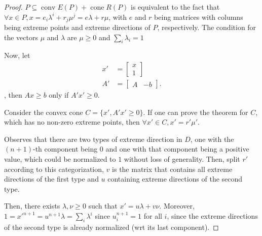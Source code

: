 \begin{proof}

\( P \subseteq \operatorname{conv} E(P) + \operatorname{cone} R(P) \) is equivalent to
the fact that \( \forall x\in P, x = e_{i}\lambda^{i} + r _{j}\mu ^{j} =
e\lambda + r\mu \), with \( e \) and \( r \) being matrices with columns being
extreme points and extreme directions of \( P \), respectively. The condition
for the vectors \( \mu  \) and \( \lambda \) are \( \mu  \ge 0 \) and \(
\sum_{i} \lambda_{i} = 1 \)

Now, let
\begin{align*}
  x' &= \begin{bmatrix} x \\ 1 \end{bmatrix} \\
  A' &= \begin{bmatrix} A & -b \end{bmatrix} 
.\end{align*},
then \( Ax \ge b \) only if \( A'x' \ge  0 \).

Consider the convex cone \( C = \{x', A'x' \ge  0\}   \). If one can
prove the theorem for \( C \), which has no non-zero extreme points, then \(
\forall x' \in C, x' = r'\mu' \).

Observes that there are two types of extreme direction in \( D \), one with the
\( (n+1) \)-th component being \( 0 \) and one with that component being a
positive value, which could be normalized to \( 1 \) without loss of generality. Then, split \( r' \) according to this categorization, \( v \) is the matrix
that contains all extreme directions of the first type and \( u \) containing
extreme directions of the second type.

Then, there exists \( \lambda, \nu \ge 0 \) such that \( x' = u\lambda + v\nu \).
Moreover, \( 1 = x'^{n+1} = u^{n+1}\lambda= \sum_{i} \lambda^{i} \) since \(
u^{n+1}_{i} = 1 \) for all \( i \), since the extreme directions of the second
type is already normalized (wrt its last component).


\end{proof}
